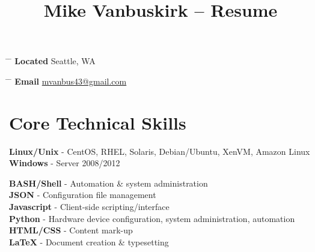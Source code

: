 \documentclass[10pt]{article} %
\begin{document}

\title{Mike Vanbuskirk -- Resume} %


\parbox{0.5\textwidth}{ %
\begin{tabbing} %
\hspace{3cm} \= \hspace{4cm} \= \kill %
{\bf Located} \> Seattle, WA\\ %
\end{tabbing}}
\hfill %
\parbox{0.5\textwidth}{ %
\begin{tabbing} %
\hspace{3cm} \= \hspace{4cm} \= \kill %
{\bf Email} \> \href{mailto:mvanbus43@gmail.com}{mvanbus43@gmail.com} \\ %
\end{tabbing}}


\section{Core Technical Skills}

{
\textbf{Linux/Unix} - CentOS, RHEL, Solaris, Debian/Ubuntu, XenVM, Amazon Linux\\
\textbf{Windows} - Server 2008/2012
}


{
\textbf{BASH/Shell} - Automation \& system administration\\
\textbf{JSON} - Configuration file management\\
\textbf{Javascript} - Client-side scripting/interface\\
\textbf{Python} - Hardware device configuration, system administration, automation\\
\textbf{HTML/CSS} - Content mark-up\\
\textbf{LaTeX} - Document creation \& typesetting
}
\end{document}
